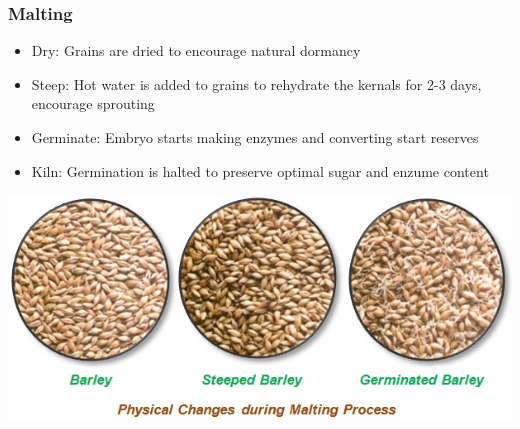 \documentclass{beamer}
\begin{document}
\begin{frame}
\frametitle{Malting}
\begin{itemize}
  \item Dry: Grains are dried to encourage natural dormancy
\item Steep:  Hot water is added to grains to rehydrate the kernals for 2-3 days, encourage sprouting
\item Germinate: Embryo starts making enzymes and converting start reserves
\item Kiln: Germination is halted to preserve optimal sugar and enzume content
\end{itemize}
\begin{center}
  \includegraphics[width=.7\linewidth]{./brewing/malting.jpg}
  \end{center}
\end{frame}
\end{document}
